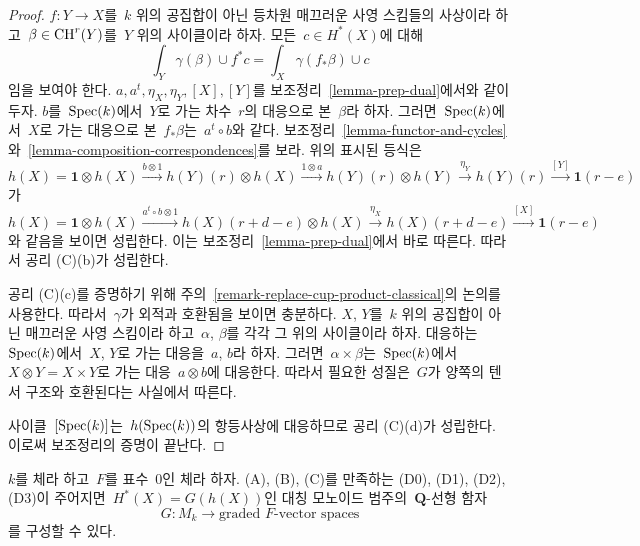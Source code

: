\begin{proof}
\medskip\noindent
$f : Y \to X$를\  $k$ 위의 공집합이 아닌 등차원 매끄러운 사영
스킴들의 사상이라 하고\  $\beta \in \mathop{\mathrm{CH}}\nolimits^r(Y)$를\  $Y$ 위의 사이클이라
하자. 모든\  $c \in H^*(X)$에 대해
$$
\int_Y \gamma(\beta) \cup f^*c = \int_X \gamma(f_*\beta) \cup c
$$
임을 보여야 한다. $a, a^t, \eta_X, \eta_Y, [X], [Y]$를 보조정리\ 
\ref{lemma-prep-dual}에서와 같이 두자. $b$를\  $\mathop{\mathrm{Spec}}(k)$에서\  $Y$로
가는 차수\  $r$의 대응으로 본\  $\beta$라 하자. 그러면\ 
$\mathop{\mathrm{Spec}}(k)$에서\  $X$로 가는 대응으로 본\  $f_*\beta$는\ 
$a^t \circ b$와 같다. 보조정리\  \ref{lemma-functor-and-cycles}와\ 
\ref{lemma-composition-correspondences}를 보라. 위의 표시된 등식은
$$
h(X) = \mathbf{1} \otimes h(X)
\xrightarrow{b \otimes 1}
h(Y)(r) \otimes h(X)
\xrightarrow{1 \otimes a}
h(Y)(r) \otimes h(Y)
\xrightarrow{\eta_Y}
h(Y)(r)
\xrightarrow{[Y]}
\mathbf{1}(r - e)
$$
가
$$
h(X) = \mathbf{1} \otimes h(X)
\xrightarrow{a^t \circ b \otimes 1}
h(X)(r + d - e) \otimes h(X)
\xrightarrow{\eta_X}
h(X)(r + d - e)
\xrightarrow{[X]}
\mathbf{1}(r - e)
$$
와 같음을 보이면 성립한다. 이는 보조정리\  \ref{lemma-prep-dual}에서
바로 따른다. 따라서 공리 (C)(b)가 성립한다.

\medskip\noindent
공리 (C)(c)를 증명하기 위해 주의\ 
\ref{remark-replace-cup-product-classical}의 논의를 사용한다. 따라서\ 
$\gamma$가 외적과 호환됨을 보이면 충분하다. $X$, $Y$를\  $k$ 위의
공집합이 아닌 매끄러운 사영 스킴이라 하고\  $\alpha$, $\beta$를 각각
그 위의 사이클이라 하자. 대응하는\  $\mathop{\mathrm{Spec}}(k)$에서\  $X$, $Y$로 가는
대응을\  $a$, $b$라 하자. 그러면\  $\alpha \times \beta$는\ 
$\mathop{\mathrm{Spec}}(k)$에서\  $X \otimes Y = X \times Y$로 가는 대응\ 
$a \otimes b$에 대응한다. 따라서 필요한 성질은\  $G$가 양쪽의 텐서
구조와 호환된다는 사실에서 따른다.

\medskip\noindent
사이클\  $[\mathop{\mathrm{Spec}}(k)]$는\  $h(\mathop{\mathrm{Spec}}(k))$의 항등사상에 대응하므로
공리 (C)(d)가 성립한다. 이로써 보조정리의 증명이 끝난다.
\end{proof}

\begin{lemma}
\label{lemma-from-weil-to-functor}
$k$를 체라 하고\  $F$를 표수\  $0$인 체라 하자. (A), (B), (C)를
만족하는 (D0), (D1), (D2), (D3)이 주어지면\ 
$H^*(X) = G(h(X))$인 대칭 모노이드 범주의\  $\mathbf{Q}$-선형 함자
$$
G : M_k \longrightarrow \text{graded }F\text{-vector spaces}
$$
를 구성할 수 있다.
\end{lemma}


